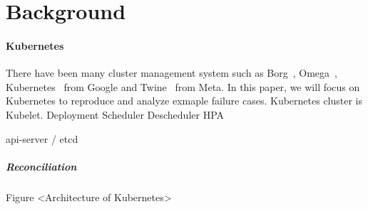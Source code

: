 \section{Background}
\label{sec:background}

\paragraph*{Kubernetes}
There have been many cluster management system such as Borg~\cite{borg}, Omega~\cite{omega}, Kubernetes~\cite{kubernetes} from Google and Twine~\cite{twine} from Meta. In this paper, we will focus on Kubernetes to reproduce and analyze exmaple failure cases.
Kubernetes cluster is 
Kubelet.
Deployment
Scheduler
Descheduler
HPA


api-server / etcd

\subparagraph*{Reconciliation}

Figure <Architecture of Kubernetes>

